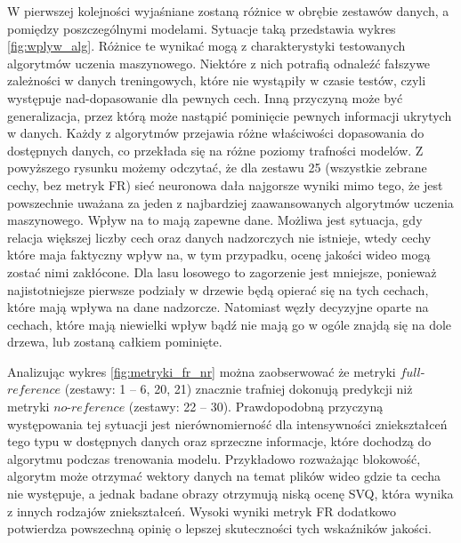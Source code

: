 W pierwszej kolejności wyjaśniane zostaną różnice w obrębie zestawów danych, a pomiędzy poszczególnymi modelami. Sytuacje taką przedstawia wykres \ref{fig:wplyw_alg}.  Różnice te wynikać mogą z charakterystyki testowanych algorytmów uczenia maszynowego. Niektóre z nich potrafią odnaleźć fałszywe zależności w danych treningowych, które nie wystąpiły w czasie testów, czyli występuje  nad-dopasowanie dla pewnych cech. Inną przyczyną może być generalizacja, przez którą może nastąpić pominięcie pewnych informacji ukrytych w danych. Każdy z algorytmów przejawia różne właściwości dopasowania do dostępnych danych, co przekłada się na różne poziomy trafności modelów. Z powyższego rysunku możemy odczytać, że dla zestawu 25 (wszystkie zebrane cechy, bez metryk FR) sieć neuronowa dała najgorsze wyniki mimo tego, że jest powszechnie uważana za jeden z najbardziej zaawansowanych algorytmów uczenia maszynowego. Wpływ na to mają zapewne dane. Możliwa jest sytuacja, gdy relacja  większej liczby cech oraz danych nadzorczych nie istnieje, wtedy cechy które maja faktyczny wpływ na, w tym przypadku, ocenę jakości wideo mogą zostać nimi zakłócone. Dla lasu losowego to zagorzenie jest mniejsze, ponieważ najistotniejsze pierwsze podziały w drzewie będą opierać się na tych cechach, które mają wpływa na dane nadzorcze. Natomiast węzły decyzyjne oparte na cechach, które mają niewielki wpływ bądź nie mają go w ogóle znajdą się na dole drzewa, lub zostaną całkiem pominięte. \par


Analizując wykres \ref{fig:metryki_fr_nr} można zaobserwować że metryki $full$-$reference$ (zestawy: 1 -- 6, 20, 21) znacznie trafniej dokonują predykcji niż metryki  $no$-$reference$ (zestawy: 22 -- 30). Prawdopodobną przyczyną występowania tej sytuacji jest nierównomierność dla intensywności zniekształceń tego typu w dostępnych danych oraz sprzeczne informacje, które dochodzą do algorytmu podczas  trenowania modelu. Przykładowo rozważając blokowość, algorytm może otrzymać wektory danych na temat plików wideo gdzie  ta cecha nie występuje, a jednak badane obrazy otrzymują niską ocenę SVQ, która wynika z innych rodzajów zniekształceń.  Wysoki wyniki metryk FR dodatkowo potwierdza powszechną opinię o lepszej skuteczności tych wskaźników jakości.

